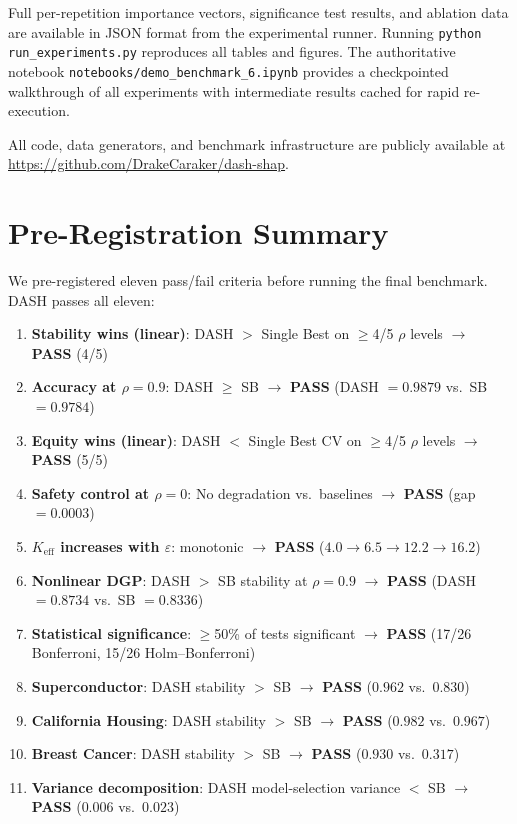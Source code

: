 \documentclass[11pt]{article}
\newcommand{\dash}{\textsc{DASH}}
\newcommand{\rhovar}{\rho}
\begin{document}
Full per-repetition importance vectors, significance test results, and
ablation data are available in JSON format from the experimental runner.
Running \texttt{python run\_experiments.py} reproduces all tables and
figures. The authoritative notebook
\texttt{notebooks/demo\_benchmark\_6.ipynb} provides a checkpointed
walkthrough of all experiments with intermediate results cached for
rapid re-execution.

All code, data generators, and benchmark infrastructure are publicly
available at \url{https://github.com/DrakeCaraker/dash-shap}.

\section{Pre-Registration Summary}
\label{app:criteria}

We pre-registered eleven pass/fail criteria before running the final
benchmark. \dash{} passes all eleven:

\begin{enumerate}
  \item \textbf{Stability wins (linear)}: DASH $>$ Single Best on $\geq$4/5
    $\rhovar$ levels $\to$ \textbf{PASS} (4/5)
  \item \textbf{Accuracy at $\rhovar = 0.9$}: DASH $\geq$ SB $\to$
    \textbf{PASS} (DASH $= 0.9879$ vs.\ SB $= 0.9784$)
  \item \textbf{Equity wins (linear)}: DASH $<$ Single Best CV on $\geq$4/5
    $\rhovar$ levels $\to$ \textbf{PASS} (5/5)
  \item \textbf{Safety control at $\rhovar = 0$}: No degradation vs.\
    baselines $\to$ \textbf{PASS} (gap $= 0.0003$)
  \item \textbf{$K_{\text{eff}}$ increases with $\varepsilon$}: monotonic
    $\to$ \textbf{PASS} ($4.0 \to 6.5 \to 12.2 \to 16.2$)
  \item \textbf{Nonlinear DGP}: DASH $>$ SB stability at $\rhovar = 0.9$
    $\to$ \textbf{PASS} (DASH $= 0.8734$ vs.\ SB $= 0.8336$)
  \item \textbf{Statistical significance}: $\geq$50\% of tests significant
    $\to$ \textbf{PASS} (17/26 Bonferroni, 15/26 Holm--Bonferroni)
  \item \textbf{Superconductor}: DASH stability $>$ SB $\to$ \textbf{PASS}
    ($0.962$ vs.\ $0.830$)
  \item \textbf{California Housing}: DASH stability $>$ SB $\to$ \textbf{PASS}
    ($0.982$ vs.\ $0.967$)
  \item \textbf{Breast Cancer}: DASH stability $>$ SB $\to$ \textbf{PASS}
    ($0.930$ vs.\ $0.317$)
  \item \textbf{Variance decomposition}: DASH model-selection variance $<$ SB
    $\to$ \textbf{PASS} ($0.006$ vs.\ $0.023$)
\end{enumerate}
\end{document}
